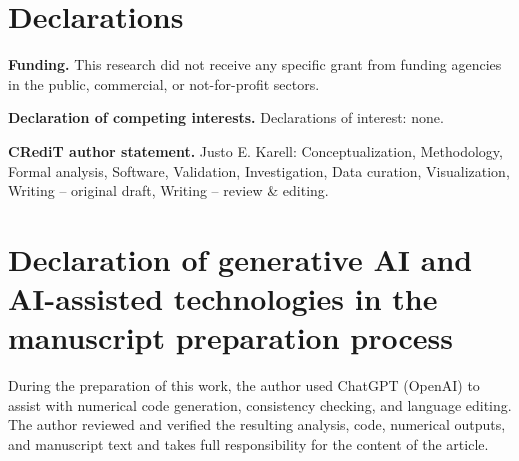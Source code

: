 \documentclass[preprint,12pt]{elsarticle}
\begin{document}
\section*{Declarations}

\noindent\textbf{Funding.} This research did not receive any specific grant from funding agencies in the public, commercial, or not-for-profit sectors.

\noindent\textbf{Declaration of competing interests.}
Declarations of interest: none.

\noindent\textbf{CRediT author statement.} Justo E. Karell: Conceptualization,
Methodology, Formal analysis, Software, Validation, Investigation, Data
curation, Visualization, Writing -- original draft, Writing -- review \&
editing.

\section*{Declaration of generative AI and AI-assisted technologies in the manuscript preparation process}
During the preparation of this work, the author used ChatGPT (OpenAI) to
assist with numerical code generation, consistency checking, and language
editing.  The author reviewed and verified the resulting analysis, code,
numerical outputs, and manuscript text and takes full responsibility for the
content of the article.
\end{document}
